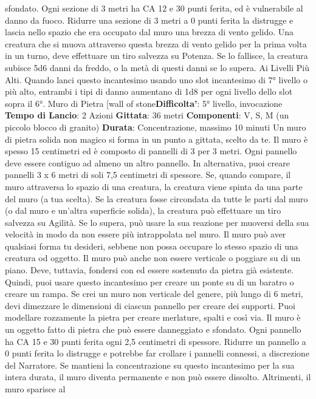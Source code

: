 \begin{multicols}{2}
sfondato. Ogni sezione di 3 metri ha CA 12 e 30 punti
ferita, ed è vulnerabile al danno da fuoco. Ridurre una
sezione di 3 metri a 0 punti ferita la distrugge e lascia
nello spazio che era occupato dal muro una brezza di
vento gelido. Una creatura che si muova attraverso
questa brezza di vento gelido per la prima volta in un
turno, deve effettuare un tiro salvezza su Potenza.
Se lo fallisce, la creatura subisce 5d6 danni da freddo,
o la metà di questi danni se lo supera.
Ai Livelli Più Alti. Quando lanci questo incantesimo
usando uno slot incantesimo di 7° livello o più alto,
entrambi i tipi di danno aumentano di 1d8 per ogni
livello dello slot sopra il 6°.
Muro di Pietra
[wall of stone\textbf{Difficolta'}:
5° livello, invocazione
\textbf{Tempo di Lancio}: 2 Azioni
\textbf{Gittata}: 36 metri
\textbf{Componenti}: V, S, M (un piccolo blocco di granito)
\textbf{Durata}: Concentrazione, massimo 10 minuti
Un muro di pietra solida non magico si forma in un
punto a gittata, scelto da te. Il muro è spesso 15
centimetri ed è composto di pannelli di 3 per 3 metri.
Ogni pannello deve essere contiguo ad almeno un altro
pannello. In alternativa, puoi creare pannelli 3 x 6 metri
di soli 7,5 centimetri di spessore.
Se, quando compare, il muro attraversa lo spazio di una
creatura, la creatura viene spinta da una parte del muro
(a tua scelta). Se la creatura fosse circondata da tutte le
parti dal muro (o dal muro e un’altra superficie solida),
la creatura può effettuare un tiro salvezza su Agilità.
Se lo supera, può usare la sua reazione per muoversi
della sua velocità in modo da non essere più
intrappolata nel muro.
Il muro può aver qualsiasi forma tu desideri, sebbene
non possa occupare lo stesso spazio di una creatura od
oggetto. Il muro può anche non essere verticale o
poggiare su di un piano. Deve, tuttavia, fondersi con ed
essere sostenuto da pietra già esistente. Quindi, puoi
usare questo incantesimo per creare un ponte su di un
baratro o creare un rampa.
Se crei un muro non verticale del genere, più lungo di 6
metri, devi dimezzare le dimensioni di ciascun pannello
per creare dei supporti. Puoi modellare rozzamente la
pietra per creare merlature, spalti e così via.
Il muro è un oggetto fatto di pietra che può essere
danneggiato e sfondato. Ogni pannello ha CA 15 e 30
punti ferita ogni 2,5 centimetri di spessore. Ridurre un
pannello a 0 punti ferita lo distrugge e potrebbe far
crollare i pannelli connessi, a discrezione del Narratore.
Se mantieni la concentrazione su questo incantesimo
per la sua intera durata, il muro diventa permanente e
non può essere dissolto. Altrimenti, il muro sparisce al

\end{multicols}
